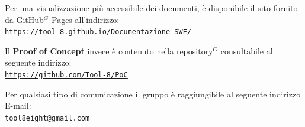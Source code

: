 \documentclass[a4paper,10pt]{article}
\begin{document}
\vspace{1\baselineskip}

Per una visualizzazione più accessibile dei documenti, è disponibile il sito fornito da GitHub$^G$ Pages all'indirizzo:\\ \href{https://tool-8.github.io/Documentazione-SWE/}{\underline{\texttt{https://tool-8.github.io/Documentazione-SWE/}}}

\vspace{2\baselineskip}

Il \textbf{Proof of Concept} invece è contenuto nella repository$^G$ consultabile al seguente indirizzo:\\
\href{https://github.com/Tool-8/PoC}{\underline{\texttt{https://github.com/Tool-8/PoC}}}

\vspace{3\baselineskip}

Per qualsiasi tipo di comunicazione il gruppo è raggiungibile al seguente indirizzo E-mail:\\
\texttt{tool8eight@gmail.com}
\end{document}
